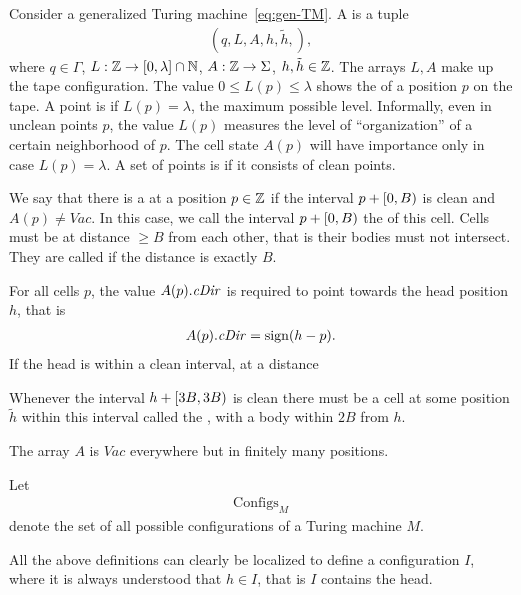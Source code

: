 \documentclass[12pt]{memoir}
\renewcommand{\le}{\leq}
\renewcommand{\ge}{\geq}
\newcommand{\fld}[1]{\ensuremath{\textit{#1\/}}}
\newcommand{\sign}{\mathop\mathrm{sign}}
\def\B{B}
\newcommand{\Vacant}{\mathit{Vac}}
\newcommand{\Configs}{\mathrm{Configs}}
\newcommand{\h}{h}
\newcommand{\hc}{\tilde h}
\newcommand{\cDir}{\fld{cDir}}
\begin{document}
\begin{definition}[Configuration]\label{def:config}
     Consider a generalized Turing machine~\eqref{eq:gen-TM}.
    A  is a tuple
        \begin{align*}
             (q,L,A,\h,\hc,),
        \end{align*}
    where \( q\in\Gamma \), 
\( L:\mathbb{Z}\to [0,\lambda]\cap\mathbb{N}\),
\( A:\mathbb{Z}\to\Sigma \), \( \h,\hc\in\bbZ \).
The arrays \( L,A \) make up the tape configuration.
The value \( 0\le L(p) \le\lambda \) shows the  of a position \( p \) on the tape.
A point is  if  \( L(p)=\lambda \), the maximum possible level.
Informally, 
even in unclean points \( p \), the value \( L(p) \) measures the level of ``organization'' of a certain
neighborhood of \( p \).
The cell state \( A(p) \) will have importance only in case \( L(p)=\lambda \).
A set of points is  if it consists of clean points.

We say that there is a  at a position \( p\in\mathbb{Z} \) if the interval
\( p+\lint{0}{\B} \) is clean and \( A(p)\ne \Vacant \).
In this case, we call the interval \( p+\lint{0}{\B} \) the  of this cell.
Cells must be at distance \( \ge\B \) from each other, that is their
bodies must not intersect.
They are called  if the distance is exactly \( \B \).

For all cells \( p \), the value \( A(p).\cDir \) is required to point towards 
the head position \( \h \), that is 
 \begin{align*}
   A(p).\cDir=\sign(\h-p).
 \end{align*}
If the head is within a clean interval, at a distance

Whenever the interval \( \h+\lint{3\B}{3\B} \) is clean there must be a
cell at some position \( \hc \) within this interval called the ,
with a body within \( 2\B \) from \( \h \).

The array \( A \) is \( \Vacant \) everywhere but in finitely many positions.

Let
    \begin{align*}
         \Configs_{M}
    \end{align*}
    denote the set of all possible configurations
    of a Turing machine \( M \).

\end{definition}

All the above definitions can clearly be localized to define a configuration
 \( I \), where it is always understood that \( \h\in I \), that is 
\( I \) contains the head.
\end{document}
